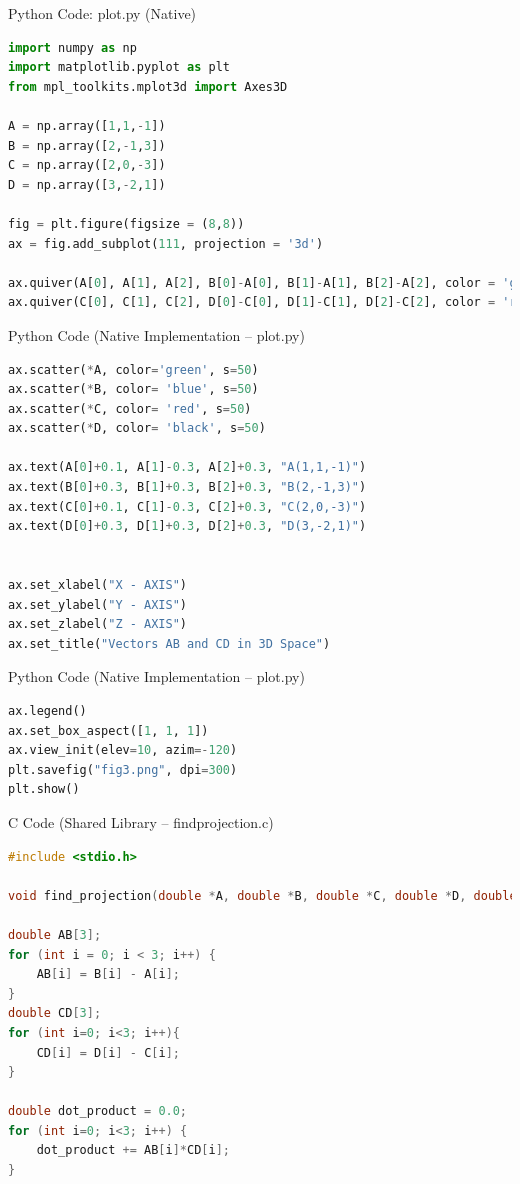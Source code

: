 \documentclass{beamer}
\begin{document}
\begin{frame}[fragile]{Python Code: plot.py (Native)}
\begin{lstlisting}[language=Python]
import numpy as np
import matplotlib.pyplot as plt
from mpl_toolkits.mplot3d import Axes3D

A = np.array([1,1,-1])
B = np.array([2,-1,3])
C = np.array([2,0,-3])
D = np.array([3,-2,1])

fig = plt.figure(figsize = (8,8))
ax = fig.add_subplot(111, projection = '3d')

ax.quiver(A[0], A[1], A[2], B[0]-A[0], B[1]-A[1], B[2]-A[2], color = 'g', label = 'AB')
ax.quiver(C[0], C[1], C[2], D[0]-C[0], D[1]-C[1], D[2]-C[2], color = 'r', label = 'CD')
\end{lstlisting}
\end{frame}


\begin{frame}[fragile]{Python Code (Native Implementation – plot.py)}
\begin{lstlisting}[language=Python]
ax.scatter(*A, color='green', s=50)
ax.scatter(*B, color= 'blue', s=50)
ax.scatter(*C, color= 'red', s=50)
ax.scatter(*D, color= 'black', s=50)

ax.text(A[0]+0.1, A[1]-0.3, A[2]+0.3, "A(1,1,-1)")
ax.text(B[0]+0.3, B[1]+0.3, B[2]+0.3, "B(2,-1,3)")
ax.text(C[0]+0.1, C[1]-0.3, C[2]+0.3, "C(2,0,-3)")
ax.text(D[0]+0.3, D[1]+0.3, D[2]+0.3, "D(3,-2,1)")


ax.set_xlabel("X - AXIS")
ax.set_ylabel("Y - AXIS")
ax.set_zlabel("Z - AXIS")
ax.set_title("Vectors AB and CD in 3D Space")
\end{lstlisting}
\end{frame}

\begin{frame}[fragile]{Python Code (Native Implementation – plot.py)}
\begin{lstlisting}[language=Python]
ax.legend()
ax.set_box_aspect([1, 1, 1])  
ax.view_init(elev=10, azim=-120)
plt.savefig("fig3.png", dpi=300)
plt.show()
\end{lstlisting}
\end{frame}

\begin{frame}[fragile]{C Code (Shared Library – findprojection.c)}
\begin{lstlisting}[language=C]
#include <stdio.h>

void find_projection(double *A, double *B, double *C, double *D, double *projection){

double AB[3];
for (int i = 0; i < 3; i++) {
    AB[i] = B[i] - A[i];
}
double CD[3];
for (int i=0; i<3; i++){
    CD[i] = D[i] - C[i];
}

double dot_product = 0.0;
for (int i=0; i<3; i++) {
    dot_product += AB[i]*CD[i];
}
\end{lstlisting}
\end{frame}
\end{document}

